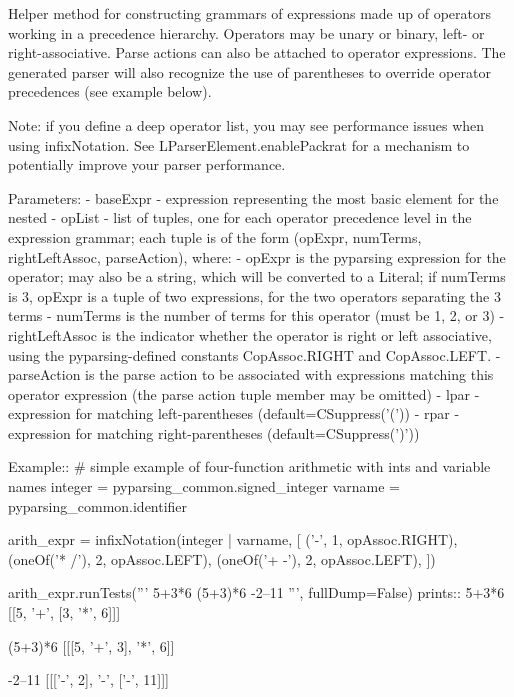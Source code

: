 \begin{DoxyVerb}Helper method for constructing grammars of expressions made up of
operators working in a precedence hierarchy.  Operators may be unary or
binary, left- or right-associative.  Parse actions can also be attached
to operator expressions. The generated parser will also recognize the use 
of parentheses to override operator precedences (see example below).

Note: if you define a deep operator list, you may see performance issues
when using infixNotation. See L{ParserElement.enablePackrat} for a
mechanism to potentially improve your parser performance.

Parameters:
 - baseExpr - expression representing the most basic element for the nested
 - opList - list of tuples, one for each operator precedence level in the
  expression grammar; each tuple is of the form
  (opExpr, numTerms, rightLeftAssoc, parseAction), where:
   - opExpr is the pyparsing expression for the operator;
      may also be a string, which will be converted to a Literal;
      if numTerms is 3, opExpr is a tuple of two expressions, for the
      two operators separating the 3 terms
   - numTerms is the number of terms for this operator (must
      be 1, 2, or 3)
   - rightLeftAssoc is the indicator whether the operator is
      right or left associative, using the pyparsing-defined
      constants C{opAssoc.RIGHT} and C{opAssoc.LEFT}.
   - parseAction is the parse action to be associated with
      expressions matching this operator expression (the
      parse action tuple member may be omitted)
 - lpar - expression for matching left-parentheses (default=C{Suppress('(')})
 - rpar - expression for matching right-parentheses (default=C{Suppress(')')})

Example::
    # simple example of four-function arithmetic with ints and variable names
    integer = pyparsing_common.signed_integer
    varname = pyparsing_common.identifier 
    
    arith_expr = infixNotation(integer | varname,
        [
        ('-', 1, opAssoc.RIGHT),
        (oneOf('* /'), 2, opAssoc.LEFT),
        (oneOf('+ -'), 2, opAssoc.LEFT),
        ])
    
    arith_expr.runTests('''
        5+3*6
        (5+3)*6
        -2--11
        ''', fullDump=False)
prints::
    5+3*6
    [[5, '+', [3, '*', 6]]]

    (5+3)*6
    [[[5, '+', 3], '*', 6]]

    -2--11
    [[['-', 2], '-', ['-', 11]]]
\end{DoxyVerb}
 \mbox{\label{namespacesetuptools_1_1__vendor_1_1pyparsing_ad42642ba9455cf9de12294141a2ead3c}} 
